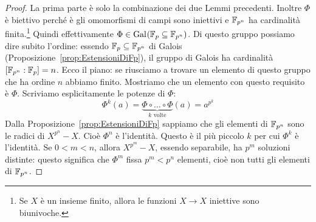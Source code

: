 \begin{proof}
La prima parte è solo la combinazione dei due Lemmi precedenti. Inoltre \(\Phi\) è biettivo perché è gli omomorfismi di campi sono iniettivi e \(\mathbb{F}_{p^n}\) ha cardinalità finita.\footnote{Se \(X\) è un insieme finito, allora le funzioni \(X \to X\) iniettive sono biunivoche.} Quindi effettivamente \(\Phi \in \operatorname{Gal}_{}\!\left(\mathbb{F}_p \subseteq \mathbb{F}_{p^n}\right)\). Di questo gruppo possiamo dire subito l'ordine: essendo \(\mathbb{F}_p \subseteq \mathbb{F}_{p^n}\) di Galois (Proposizione~\ref{prop:EstensioniDiFp}), il gruppo di Galois ha cardinalità \(\left[\mathbb{F}_{p^n}:\mathbb{F}_p\right] = n\). Ecco il piano: se riusciamo a trovare un elemento di questo gruppo che ha ordine \(n\) abbiamo finito. Mostriamo che un elemento con questo requisito è \(\Phi\).\newline
Scriviamo esplicitamente le potenze di \(\Phi\):
\[\Phi^k (a) = \underbrace{\Phi \circ \dots \circ \Phi}_{k \text{ volte}}(a) = a^{p^k}\]
Dalla Proposizione~\ref{prop:EstensioniDiFp} sappiamo che gli elementi di \(\mathbb{F}_{p^n}\) sono le radici di \(X^{p^n}-X\).  Cioè \(\Phi^n\) è l'identità. Questo è il più piccolo \(k\) per cui \(\Phi^k\) è l'identità. Se \(0 < m < n\), allora \(X^{p^m}-X\), essendo separabile, ha \(p^m\) soluzioni distinte: questo significa che \(\Phi^m\) fissa \(p^m < p^n\) elementi, cioè non tutti gli elementi di \(\mathbb{F}_{p^n}\).
\end{proof}

%

%

